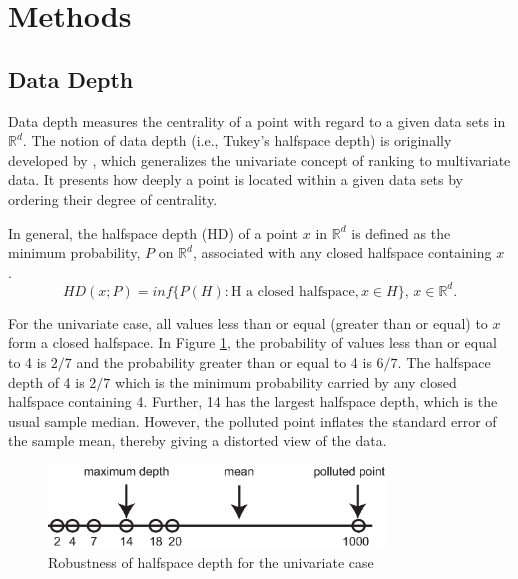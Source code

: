 \documentclass[a4paper,UKenglish]{lipics-v2016}
\begin{document}
\section{Methods}
\label{sec:methods}

\subsection{Data Depth}
Data depth measures the centrality of a point with regard to a given data sets in $\mathbb{R}^d$.  The notion of data depth (i.e., Tukey's halfspace depth) is originally developed by \cite{tukey75ICM}, which generalizes the univariate concept of ranking to multivariate data. It presents how deeply a point is located within a given data sets by ordering their degree of centrality. 

In general, the halfspace depth (HD) of a point $x$ in  $\mathbb{R}^d$ is defined as the minimum probability, $P$ on  $\mathbb{R}^d$, associated with any closed halfspace containing $x$ \cite{liu00AS}. 
\begin{equation*}\label{eq:hd}
HD(x;P) = inf\{P(H): \text{H a closed halfspace}, x \in H\}\text{, } x \in \mathbb{R}^d.
\end{equation*}

For the univariate case, all values less than or equal (greater than or equal) to $x$ form a closed halfspace. 
In Figure \ref{fig:hd_uni}, the probability of values less than or equal to 4 is  $2/7$ and the probability greater than or equal to 4 is $6/7$. The halfspace depth of 4 is $2/7$ which is the minimum probability carried by any closed halfspace containing 4. Further, 14 has the largest halfspace depth, which is the usual sample median. However, the polluted point inflates the standard error of the sample mean, thereby giving a distorted view of the data. 


\begin{figure}
	\centering
	\includegraphics[width=0.8\textwidth]{images/depth_uni.eps}
	\caption{Robustness of halfspace depth for the univariate case}
	\label{fig:hd_uni}	
\end{figure}
\end{document}
